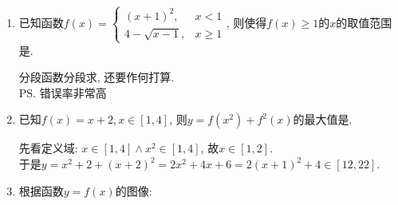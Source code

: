 \begin{enumerate}
\begin{jieda}
\begin{enumerate}
    \item 问题等价于$y=ax^2+ax+1$的值域包含$(0,+\infty)$. \\
    $a=0$显然不符合条件; \\
    $a\neq 0$时, $a>0$且$\Delta\geq0$, 即$a\geq 4$. \\
    故$a\geq 4$. \\
    \ps 学生容易犯两类错误：\\
        1. 误认为当$\sqrt{ax^2+ax+1}$的定义域是$\mathbf{R}$时，其值域是$(0, +\infty)$，从而错误地将问题转化为$\sqrt{ax^2+ax+1}$的定义域是$\mathbf{R}$，要求对应的二次函数开口向上且$\Delta < 0$，得到$[0, 4)$\\
        2. 计算$\Delta \geq 0$之后忘记开口方向的约束，得到$(-\infty, 0] \cup [4, +\infty)$
    \end{enumerate}
    \end{jieda}
    \item 已知函数$f(x)=\begin{cases}
    (x+1)^2, & x<1\\
    4-\sqrt{x-1}, & x\geq 1
    \end{cases}$, 
    则使得$f(x)\geq 1$的$x$的取值范围是\blkda[3]{$(-\infty,-2]\cup[0,10]$}. 
    \begin{jieda}
    分段函数分段求, 还要作何打算. \\
    \ps 错误率非常高
    \end{jieda}
    \clearpage
    \item 已知$f(x)=x+2, x\in[1,4]$, 则$y=f(x^2)+f^2(x)$的最大值是. 
    \begin{jieda}
    先看定义域: $x\in[1,4]\land x^2\in[1,4]$, 故$x\in[1,2]$. \\
    于是$y=x^2+2+(x+2)^2=2x^2+4x+6=2(x+1)^2+4\in[12,22]$. 
    \end{jieda}
    \item 根据函数$y=f(x)$的图像: \\
    \begin{enumerate}

\end{enumerate}
\end{enumerate}
